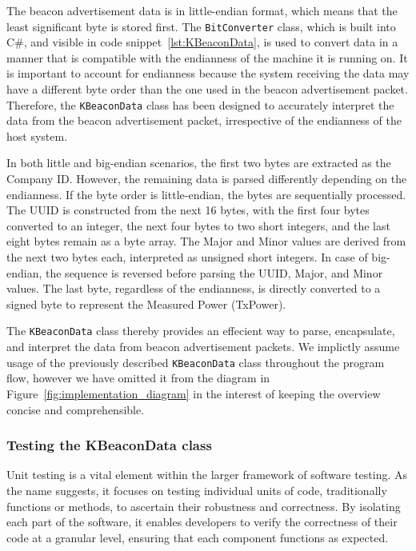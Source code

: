The beacon advertisement data is in little-endian format, which means that the least significant byte is stored first.\cite{CoreSpecification2023}
The \texttt{BitConverter} class, which is built into C\#, and visible in code snippet~\ref{lst:KBeaconData}, is used to convert data in a manner that is compatible with the endianness of the machine it is running on. 
It is important to account for endianness because the system receiving the data may have a different byte order than the one used in the beacon advertisement packet. 
Therefore, the \texttt{KBeaconData} class has been designed to accurately interpret the data from the beacon advertisement packet, irrespective of the endianness of the host system.

In both little and big-endian scenarios, the first two bytes are extracted as the Company ID.
However, the remaining data is parsed differently depending on the endianness. If the byte order is little-endian, the bytes are sequentially processed. The UUID is constructed from the next 16 bytes, with the first four bytes converted to an integer, the next four bytes to two short integers, and the last eight bytes remain as a byte array. The Major and Minor values are derived from the next two bytes each, interpreted as unsigned short integers. In case of big-endian, the sequence is reversed before parsing the UUID, Major, and Minor values.
The last byte, regardless of the endianness, is directly converted to a signed byte to represent the Measured Power (TxPower).

The \texttt{KBeaconData} class thereby provides an effecient way to parse, encapsulate, and interpret the data from beacon advertisement packets.
We implictly assume usage of the previously described \texttt{KBeaconData} class throughout the program flow, however we have omitted it from the diagram in Figure~\ref{fig:implementation_diagram} in the interest of keeping the overview concise and comprehensible.


\subsubsection{Testing the KBeaconData class}
Unit testing is a vital element within the larger framework of software testing. 
As the name suggests, it focuses on testing individual units of code, traditionally functions or methods, to ascertain their robustness and correctness. By isolating each part of the software, it enables developers to verify the correctness of their code at a granular level, ensuring that each component functions as expected.\cite{sommervilleSoftwareEngineering2016}

